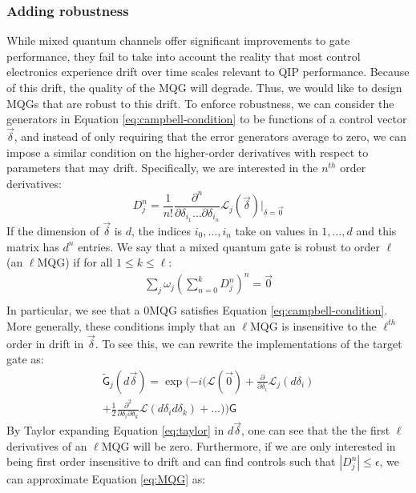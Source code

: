 \documentclass[aps,nofootinbib,pra,notitlepage,twocolumn]{revtex4-1}
\newcommand{\actual}{\ensuremath{\tilde{\mathsf{G}}}}
\newcommand{\target}{\ensuremath{{\mathsf{G}}}}
\begin{document}
\subsubsection{Adding robustness} %
\label{sub:adding_robustness}
While mixed quantum channels offer significant improvements to gate performance, they fail to take into account the reality that most control electronics experience drift over time scales relevant to QIP performance. Because of this drift, the quality of the MQG will degrade. Thus, we would like to design MQGs that are robust to this drift. To enforce robustness, we can consider the generators in Equation \ref{eq:campbell-condition} to be functions of a control vector $\vec{\delta}$, and instead of only requiring that the error generators average to zero, we can impose a similar condition on the higher-order derivatives with respect to parameters that may drift. Specifically, we are interested in the $n^{th}$ order derivatives:
\begin{equation}
D^n_j = \frac{1}{n!}\frac{\partial^{n}}{\partial\delta_{i_1}\ldots\partial\delta_{i_n}}\mathcal{L}_j(\vec{\delta})|_{\delta=\vec{0}}
\end{equation}
If the dimension of $\vec{\delta}$ is $d$, the indices $i_0, \ldots, i_n$ take on values in $1, \ldots, d$ and this matrix has $d^n$ entries. 
We say that a mixed quantum gate is robust to order $\ell$ (an $\ell$MQG) if for all $1 \leq k \leq \ell$:
\begin{equation}\label{eq:MQG}
\begin{gathered}
\sum_j\omega_j(\sum_{n=0}^k D^n_j)^n = \vec{0}\\
\end{gathered}
\end{equation}
In particular, we see that a 0MQG satisfies Equation \ref{eq:campbell-condition}. More generally, these conditions imply that an $\ell$MQG is insensitive to the $\ell^{th}$ order in drift in $\vec{\delta}$. To see this, we can rewrite the implementations of the target gate as:
\begin{equation}\label{eq:taylor}
\begin{gathered}
\actual_j(d\vec{\delta}) = \exp(-i(\mathcal{L}(\vec{0}) + \frac{\partial}{\partial\delta_i}\mathcal{L}_j(d\delta_i)\\ +  \frac{1}{2}\frac{\partial^2}{\partial\delta_i\partial\delta_k} \mathcal{L}(d\delta_i d\delta_k) + \ldots))\target
\end{gathered}
\end{equation}
By Taylor expanding Equation \ref{eq:taylor} in $d\vec{\delta}$, one can see that the the first $\ell$ derivatives of an $\ell$MQG will be zero. Furthermore, if we are only interested in being first order insensitive to drift and can find controls such that $|D_j^n|\leq\epsilon$, we can approximate Equation \ref{eq:MQG} as:
\end{document}
